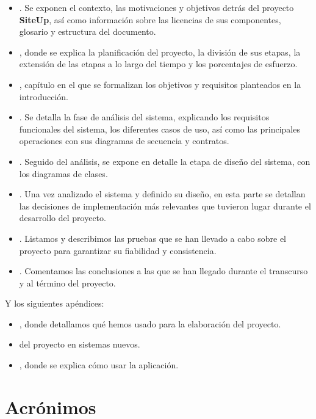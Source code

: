 \begin{itemize}
\item \textbf{}. Se exponen el contexto, las motivaciones y
  objetivos detrás del proyecto \textbf{SiteUp}, así como información sobre las
  licencias de sus componentes, glosario y estructura del documento.

\item \textbf{}, donde se explica la planificación del
  proyecto, la división de sus etapas, la extensión de las etapas a lo largo del
  tiempo y los porcentajes de esfuerzo.

\item \textbf{}, capítulo en el que se formalizan los
  objetivos y requisitos planteados en la introducción.

\item \textbf{}. Se detalla la fase de análisis del
  sistema, explicando los requisitos funcionales del sistema, los diferentes
  casos de uso, así como las principales operaciones con sus diagramas de
  secuencia y contratos.

\item \textbf{}. Seguido del análisis, se expone en detalle
  la etapa de diseño del sistema, con los diagramas de clases.

\item \textbf{}. Una vez analizado el sistema y
  definido su diseño, en esta parte se detallan las decisiones de implementación
  más relevantes que tuvieron lugar durante el desarrollo del proyecto.

\item \textbf{}. Listamos y describimos las pruebas que se
  han llevado a cabo sobre el proyecto para garantizar su fiabilidad y
  consistencia.

\item \textbf{}. Comentamos las conclusiones a las
  que se han llegado durante el transcurso y al término del proyecto.
\end{itemize}

Y los siguientes apéndices:
\begin{itemize}
\item \textbf{}, donde detallamos qué hemos usado para la
  elaboración del proyecto.
\item \textbf{} del proyecto en sistemas nuevos.
\item \textbf{}, donde se explica cómo usar la aplicación.
\end{itemize}

\section{Acrónimos}




